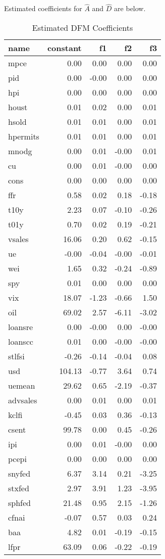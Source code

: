 \documentclass[11pt, letterpaper]{article}\usepackage[]{graphicx}\usepackage[]{color}
\begin{document}
Estimated coefficients for $\widehat{A}$ and $\widehat{D}$ are below.
\begin{table}[H]
\centering
\begingroup\footnotesize
\begin{tabular}{lrrrr}
  \hline
name & constant & f1 & f2 & f3 \\ 
  \hline
mpce & 0.00 & 0.00 & 0.00 & 0.00 \\ 
  pid & 0.00 & -0.00 & 0.00 & 0.00 \\ 
  hpi & 0.00 & 0.00 & 0.00 & 0.00 \\ 
  houst & 0.01 & 0.02 & 0.00 & 0.01 \\ 
  hsold & 0.01 & 0.01 & 0.00 & 0.01 \\ 
  hpermits & 0.01 & 0.01 & 0.00 & 0.01 \\ 
  mnodg & 0.00 & 0.01 & -0.00 & 0.01 \\ 
  cu & 0.00 & 0.01 & -0.00 & 0.00 \\ 
  cons & 0.00 & 0.00 & 0.00 & 0.00 \\ 
  ffr & 0.58 & 0.02 & 0.18 & -0.18 \\ 
  t10y & 2.23 & 0.07 & -0.10 & -0.26 \\ 
  t01y & 0.70 & 0.02 & 0.19 & -0.21 \\ 
  vsales & 16.06 & 0.20 & 0.62 & -0.15 \\ 
  ue & -0.00 & -0.04 & -0.00 & -0.01 \\ 
  wei & 1.65 & 0.32 & -0.24 & -0.89 \\ 
  spy & 0.01 & 0.00 & 0.00 & 0.00 \\ 
  vix & 18.07 & -1.23 & -0.66 & 1.50 \\ 
  oil & 69.02 & 2.57 & -6.11 & -3.02 \\ 
  loansre & 0.00 & -0.00 & 0.00 & -0.00 \\ 
  loanscc & 0.01 & 0.00 & -0.00 & -0.00 \\ 
  stlfsi & -0.26 & -0.14 & -0.04 & 0.08 \\ 
  usd & 104.13 & -0.77 & 3.64 & 0.74 \\ 
  uemean & 29.62 & 0.65 & -2.19 & -0.37 \\ 
  advsales & 0.00 & 0.01 & 0.00 & 0.01 \\ 
  kclfi & -0.45 & 0.03 & 0.36 & -0.13 \\ 
  csent & 99.78 & 0.00 & 0.45 & -0.26 \\ 
  ipi & 0.00 & 0.01 & -0.00 & 0.00 \\ 
  pcepi & 0.00 & 0.00 & 0.00 & 0.00 \\ 
  snyfed & 6.37 & 3.14 & 0.21 & -3.25 \\ 
  stxfed & 2.97 & 3.91 & 1.23 & -3.95 \\ 
  sphfed & 21.48 & 0.95 & 2.15 & -1.26 \\ 
  cfnai & -0.07 & 0.57 & 0.03 & 0.24 \\ 
  baa & 4.82 & 0.01 & -0.19 & -0.15 \\ 
  lfpr & 63.09 & 0.06 & -0.22 & -0.19 \\ 
   \hline
\end{tabular}
\endgroup
\caption{Estimated DFM Coefficients} 
\end{table}
\end{document}
